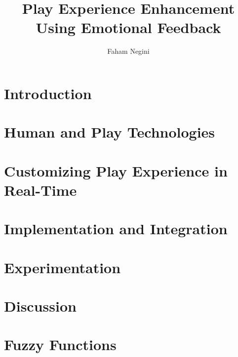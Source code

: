 \documentclass{uofsthesis-cs}
\title{Play Experience Enhancement Using Emotional Feedback}
\author{Faham Negini}
\begin{document}
\maketitle

\frontmatter


\chapter{Introduction}                              
\chapter{Human and Play Technologies}               
\chapter{Customizing Play Experience in Real-Time}  
\chapter{Implementation and Integration}            
\chapter{Experimentation}                           
\chapter{Discussion}                                




\uofsappendix
\chapter{Fuzzy Functions} 

\end{document}
